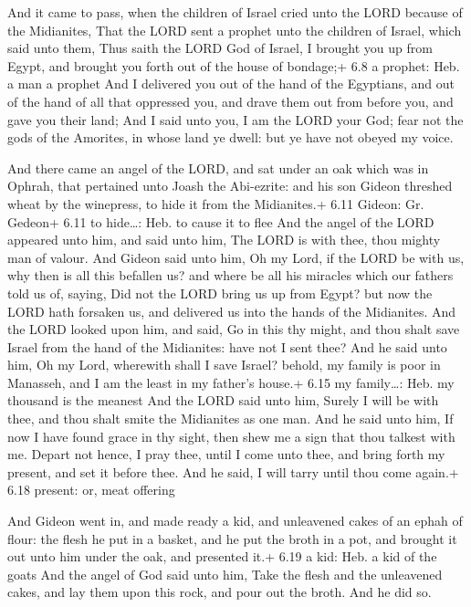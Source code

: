  And it came to pass, when the children of Israel cried
unto the LORD because of the Midianites,  That the LORD sent
a prophet unto the children of Israel, which said unto them, Thus saith
the LORD God of Israel, I brought you up from Egypt, and brought you
forth out of the house of bondage;+ 6.8 a prophet: Heb. a man a prophet
 And I delivered you out of the hand of the Egyptians, and
out of the hand of all that oppressed you, and drave them out from
before you, and gave you their land;  And I said unto you,
I am the LORD your God; fear not the gods of the Amorites, in whose land
ye dwell: but ye have not obeyed my voice.

 And there came an angel of the LORD, and sat under an
oak which was in Ophrah, that pertained unto Joash the Abi-ezrite: and
his son Gideon threshed wheat by the winepress, to hide it from the
Midianites.+ 6.11 Gideon: Gr. Gedeon+ 6.11 to hide\ldots: Heb. to cause
it to flee  And the angel of the LORD appeared unto him,
and said unto him, The LORD is with thee, thou mighty man of valour.
 And Gideon said unto him, Oh my Lord, if the LORD be with
us, why then is all this befallen us? and where be all his miracles
which our fathers told us of, saying, Did not the LORD bring us up from
Egypt? but now the LORD hath forsaken us, and delivered us into the
hands of the Midianites.  And the LORD looked upon him, and
said, Go in this thy might, and thou shalt save Israel from the hand of
the Midianites: have not I sent thee?  And he said unto
him, Oh my Lord, wherewith shall I save Israel? behold, my family is
poor in Manasseh, and I am the least in my father's house.+ 6.15 my
family\ldots: Heb. my thousand is the meanest  And the LORD
said unto him, Surely I will be with thee, and thou shalt smite the
Midianites as one man.  And he said unto him, If now I have
found grace in thy sight, then shew me a sign that thou talkest with me.
 Depart not hence, I pray thee, until I come unto thee, and
bring forth my present, and set it before thee. And he said, I will
tarry until thou come again.+ 6.18 present: or, meat offering

 And Gideon went in, and made ready a kid, and unleavened
cakes of an ephah of flour: the flesh he put in a basket, and he put the
broth in a pot, and brought it out unto him under the oak, and presented
it.+ 6.19 a kid: Heb. a kid of the goats  And the angel of
God said unto him, Take the flesh and the unleavened cakes, and lay them
upon this rock, and pour out the broth. And he did so.

